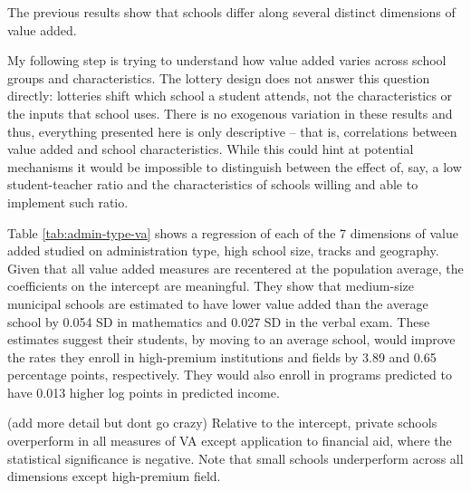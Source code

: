 \documentclass[a4paper, article, english, oneside, unknownkeysallowed, 12pt]{memoir}
\begin{document}
The previous results show that schools differ along several distinct dimensions of value added.

My following step is trying to understand how value added varies across school groups and characteristics. 
The lottery design does not answer this question directly: lotteries shift which school a student attends, not the characteristics or the inputs that school uses.
There is no exogenous variation in these results and thus, everything presented here is only descriptive -- that is, correlations between value added and school characteristics.
While this could hint at potential mechanisms it would be impossible to distinguish between the effect of, say, a low student-teacher ratio and the characteristics of schools willing and able to implement such ratio.






Table \ref{tab:admin-type-va} shows a regression of each of the 7 dimensions of value added studied on administration type, high school size, tracks and geography.
Given that all value added measures are recentered at the population average, the coefficients on the intercept are meaningful.
They show that medium-size municipal schools are estimated to have lower value added than the average school by 0.054 SD in mathematics and 0.027 SD in the verbal exam.
These estimates suggest their students, by moving to an average school, would improve the rates they enroll in high-premium institutions and fields by 3.89 and 0.65 percentage points, respectively. 
They would also enroll in programs predicted to have 0.013 higher log points in predicted income. 

(add more detail but dont go crazy)
Relative to the intercept, private schools overperform in all measures of VA except application to financial aid, where the statistical significance is negative.
Note that small schools underperform across all dimensions except high-premium field. 




\end{document}
